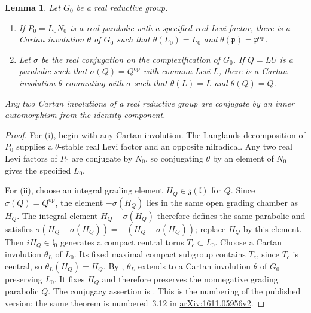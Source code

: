 \documentclass[10pt]{amsart}
\numberwithin{equation}{section}
\theoremstyle{plain}
\newtheorem{lemma}[proposition]{Lemma}
\theoremstyle{definition}
\theoremstyle{remark}
\begin{document}
\begin{lemma}\label{lem:adapted-cartan}
Let $G_0$ be a real reductive group.
\begin{enumerate}[label=\textup{(\roman*)}]
 \item If $P_0=L_0N_0$ is a real parabolic with a specified real Levi
 factor, there is a Cartan involution $\theta$ of $G_0$ such that
 $\theta(L_0)=L_0$ and $\theta(\mathfrak p)=\mathfrak p^{\mathrm{op}}$.
 \item Let $\sigma$ be the real conjugation on the complexification of
 $G_0$. If $Q=LU$ is a parabolic such that
 $\sigma(Q)=Q^{\mathrm{op}}$ with common Levi $L$, there is a Cartan
 involution $\theta$ commuting with $\sigma$ such that
 $\theta(L)=L$ and $\theta(Q)=Q$.
\end{enumerate}
Any two Cartan involutions of a real reductive group are conjugate by an
inner automorphism from the identity component.
\end{lemma}

\begin{proof}
For \textup{(i)}, begin with any Cartan involution. The Langlands
decomposition of $P_0$ supplies a $\theta$-stable real Levi factor and an
opposite nilradical. Any two real Levi factors of $P_0$ are conjugate by
$N_0$, so conjugating $\theta$ by an element of $N_0$ gives the specified
$L_0$.

For \textup{(ii)}, choose an integral grading element
$H_Q\in\mathfrak z(\mathfrak l)$ for $Q$. Since $\sigma(Q)=Q^{\mathrm{op}}$,
the element $-\sigma(H_Q)$ lies in the same open grading chamber as $H_Q$.
The integral element $H_Q-\sigma(H_Q)$ therefore defines the same parabolic
and satisfies $\sigma(H_Q-\sigma(H_Q))=-(H_Q-\sigma(H_Q))$; replace $H_Q$
by this element. Then $iH_Q\in\mathfrak l_0$ generates a compact central
torus $T_c\subset L_0$. Choose a Cartan involution $\theta_L$ of $L_0$.
Its fixed maximal compact subgroup contains $T_c$, since $T_c$ is central,
so $\theta_L(H_Q)=H_Q$. By
\cite[Theorem~3.13(1)(b)]{AT18}, $\theta_L$ extends to a Cartan involution
$\theta$ of $G_0$ preserving $L_0$. It fixes $H_Q$ and therefore preserves
the nonnegative grading parabolic $Q$. The conjugacy assertion is
\cite[Theorem~3.13(1)(a)]{AT18}. This is the numbering of the
published version; the same theorem is numbered~3.12 in
\href{https://arxiv.org/abs/1611.05956v2}{arXiv:1611.05956v2}.
\end{proof}
\end{document}
